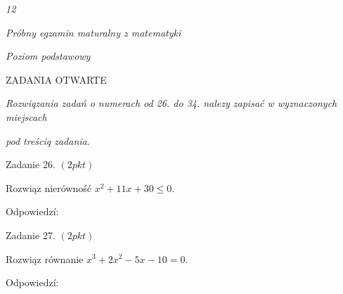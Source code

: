 \documentclass[a4paper,12pt]{article}
\begin{document}
{\it 12}

{\it Próbny egzamin maturalny z matematyki}

{\it Poziom podstawowy}

ZADANIA OTWARTE

{\it Rozwiqzania zadań o numerach od 26. do 34. nalezy zapisać w wyznaczonych miejscach}

{\it pod treściq zadania}.

Zadanie 26. $(2pkt)$

Rozwiąz nierówność $x^{2}+11x+30\leq 0.$

Odpowiedzí:

Zadanie 27. $(2pkt)$

Rozwiąz równanie $x^{3}+2x^{2}-5x-10=0.$

Odpowiedzí:
\end{document}
